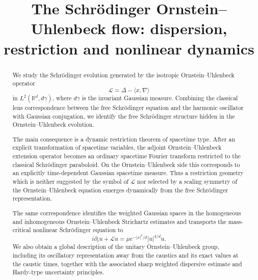 \documentclass[11pt,a4paper]{amsart}
\numberwithin{equation}{section}
\numberwithin{equation}{section}
\begin{document}
\title[]{The Schr\"odinger Ornstein--Uhlenbeck flow:
dispersion, restriction and nonlinear dynamics}












\date{}
\begin{abstract}
We study the Schr\"odinger evolution generated by the isotropic
Ornstein--Uhlenbeck operator
\[
\mathscr L=\Delta-\langle x,\nabla\rangle
\]
in $L^2(\mathbb R^d,d\gamma)$, where $d\gamma$ is the invariant
Gaussian measure.  Combining the classical lens correspondence
between the free Schr\"odinger equation and the harmonic oscillator
with Gaussian conjugation, we identify the free Schr\"odinger
structure hidden in the Ornstein--Uhlenbeck evolution.

The main consequence is a dynamic restriction theorem of spacetime
type.  After an explicit transformation of spacetime variables, the
adjoint Ornstein--Uhlenbeck extension operator becomes an ordinary
spacetime Fourier transform restricted to the classical
Schr\"odinger paraboloid.  On the Ornstein--Uhlenbeck side this
corresponds to an explicitly time-dependent Gaussian spacetime
measure.  Thus a restriction geometry which is neither suggested by
the symbol of $\mathscr L$ nor selected by a scaling symmetry of the
Ornstein--Uhlenbeck equation emerges dynamically from the free
Schr\"odinger representation.

The same correspondence identifies the weighted Gaussian spaces in
the homogeneous and inhomogeneous Ornstein--Uhlenbeck Strichartz
estimates and transports the mass-critical nonlinear Schr\"odinger
equation to
\[
i\partial_tu+\mathscr Lu
=
\mu e^{-|x|^2/d}|u|^{4/d}u.
\]
We also obtain a global description of the unitary
Ornstein--Uhlenbeck group, including its oscillatory representation
away from the caustics and its exact values at the caustic times,
together with the associated sharp weighted dispersive estimate and
Hardy-type uncertainty principles.
\end{abstract}
\end{document}
